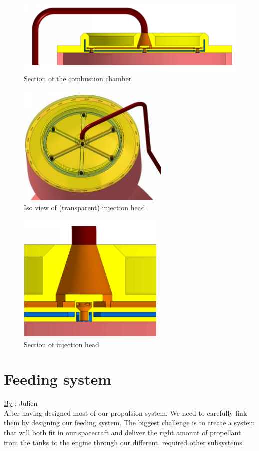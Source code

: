 \begin{figure}[H]
	\centering\includegraphics[width=0.8\linewidth]{sectioncc}
	\caption{Section of the combustion chamber}
\end{figure}
\begin{figure}[H]
	\centering\includegraphics[width=0.5\linewidth]{isoview}
	\caption{Iso view of (transparent) injection head}
\end{figure}
\begin{figure}[H]
	\centering\includegraphics[width=0.5\linewidth]{headsection}
	\caption{Section of injection head}
\end{figure}
\section{Feeding system}
\qquad \underline{By} : Julien\\
\label{sec:10-7}
After having designed most of our propulsion system. We need to carefully link them by designing our feeding system. The biggest challenge is to create a system that will both fit in our spacecraft and deliver the right amount of propellant from the tanks to the engine through our different, required other subsystems.\\


